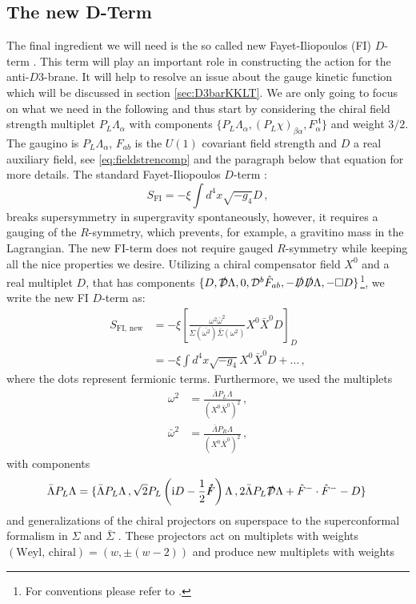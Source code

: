 \documentclass[a4paper,12pt]{report}
\newcommand{\be}{\begin{equation}}
\newcommand{\ee}{\end{equation}}
\newcommand{\bea}{\begin{equation}\begin{aligned}}
\newcommand{\eea}{\end{aligned}\end{equation}}
\def\rmi{{\rm i}}
\begin{document}
\subsection{The new D-Term}
\label{sec:newD}
The final ingredient we will need is the so called new Fayet-Iliopoulos (FI) $D$-term \cite{Cribiori:2017laj,Cribiori:2018dlc,Cribiori:2018hxv,Kuzenko:2018jlz,Antoniadis:2018cpq}. This term will play an important role in constructing the action for the anti-$D3$-brane. It will help to resolve an issue about the gauge kinetic function which will be discussed in section \ref{sec:D3barKKLT}. We are only going to focus on what we need in the following and thus start by considering the chiral field strength multiplet $P_L \Lambda_\alpha$ with components $\{P_L\Lambda_\alpha,(P_L\chi)_{\beta\alpha},F_\alpha^\Lambda\}$ and weight $3/2$. The gaugino is $P_L \Lambda_\alpha$, $F_{ab}$ is the $U(1)$ covariant field strength and $D$ a real auxiliary field, see \eqref{eq:fieldstrencomp} and the paragraph below that equation for more details. The standard Fayet-Iliopoulos $D$-term \cite{Fayet:1974jb,Freedman:1976uk}:
\be 
S_{\text{FI}}=-\xi \int d^4x \sqrt{-g_4}D\,,
\label{eq:FIDterm}
\ee
breaks supersymmetry in supergravity spontaneously, however, it requires a gauging of the $R$-symmetry, which prevents, for example, a gravitino mass in the Lagrangian. The new FI-term does not require gauged $R$-symmetry while keeping all the nice properties we desire. Utilizing a chiral compensator field $X^0$ and a real multiplet $D$, that has components $\{D,\slashed{\mathcal{D}}\Lambda,0,\mathcal{D}^b \hat{F}_{ab},-\slashed{D}\slashed{D}\Lambda,-\square D\}$\footnote{For conventions please refer to \cite{Freedman:2012zz}.}, we write the new FI $D$-term as:
\bea 
S_{\text{FI, new}} &= - \xi \left[ \frac{\omega^2\bar{\omega}^2}{\Sigma(\bar{\omega^2})\bar{\Sigma}(\omega^2)}X^0\bar{X}^0D\right]_D\\
&= -\xi \int d^4x \sqrt{-g_4}X^0\bar{X}^0 D + \ldots\,,
\eea
where the dots represent fermionic terms. Furthermore, we used the multiplets
\bea 
\omega^2 &= \frac{\bar{\Lambda}P_L \Lambda}{\left(X^0\bar{X}^0\right)^2}\,,\\
\bar{\omega}^2 &= \frac{\bar{\Lambda}P_R\Lambda}{\left(X^0\bar{X}^0\right)^2}\,,
\label{eq:Dnew}
\eea
with components
\be 
\bar{\Lambda}P_L\Lambda = \{\bar{\Lambda}P_L\Lambda\,,\sqrt{2}P_L\left(\rmi D-\frac{1}{2}\slashed{\hat{F}}\right)\Lambda\,,2\bar{\Lambda}P_L\slashed{\mathcal{D}}\Lambda+\hat{F}^-\cdot\hat{F}^--D\}\,
\ee
and generalizations of the chiral projectors on superspace to the superconformal formalism in $\Sigma$ and $\bar{\Sigma}$ \cite{Ferrara:2016een}. These projectors act on multiplets with weights $(\text{Weyl, chiral})=(w,\pm(w-2))$ and produce new multiplets with weights
\end{document}

